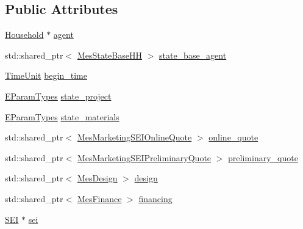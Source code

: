 \subsection*{Public Attributes}
\begin{DoxyCompactItemize}
\item 
\hyperlink{classsolar__core_1_1_household}{Household} $\ast$ \hyperlink{classsolar__core_1_1_p_v_project_a20e8115154979d2f856f1acceb6bb2b1}{agent}
\item 
std\+::shared\+\_\+ptr$<$ \hyperlink{classsolar__core_1_1_mes_state_base_h_h}{Mes\+State\+Base\+H\+H} $>$ \hyperlink{classsolar__core_1_1_p_v_project_a1a3576ddac7b82f9a2d7c139af9850d2}{state\+\_\+base\+\_\+agent}
\item 
\hyperlink{namespacesolar__core_a4b5949d07259da6f8a20d12a30403e90}{Time\+Unit} \hyperlink{classsolar__core_1_1_p_v_project_a5b8869c2a2580e5183a7796580074555}{begin\+\_\+time}
\item 
\hyperlink{namespacesolar__core_aa1147341e5ef7a40d68d1bd68e149362}{E\+Param\+Types} \hyperlink{classsolar__core_1_1_p_v_project_ab25a22c1202f2314a55dc9a759922183}{state\+\_\+project}
\item 
\hyperlink{namespacesolar__core_aa1147341e5ef7a40d68d1bd68e149362}{E\+Param\+Types} \hyperlink{classsolar__core_1_1_p_v_project_aaac22e629b55f970a4ad43b1fcd756d1}{state\+\_\+materials}
\item 
std\+::shared\+\_\+ptr$<$ \hyperlink{classsolar__core_1_1_mes_marketing_s_e_i_online_quote}{Mes\+Marketing\+S\+E\+I\+Online\+Quote} $>$ \hyperlink{classsolar__core_1_1_p_v_project_ae7998ae898c0230fbde18818cfd088a1}{online\+\_\+quote}
\item 
std\+::shared\+\_\+ptr$<$ \hyperlink{classsolar__core_1_1_mes_marketing_s_e_i_preliminary_quote}{Mes\+Marketing\+S\+E\+I\+Preliminary\+Quote} $>$ \hyperlink{classsolar__core_1_1_p_v_project_a5d75e9dfe664f7307b0dc24c1f00d8a9}{preliminary\+\_\+quote}
\item 
std\+::shared\+\_\+ptr$<$ \hyperlink{classsolar__core_1_1_mes_design}{Mes\+Design} $>$ \hyperlink{classsolar__core_1_1_p_v_project_a0e3e8228c8129ccd07e44503ef8577a8}{design}
\item 
std\+::shared\+\_\+ptr$<$ \hyperlink{classsolar__core_1_1_mes_finance}{Mes\+Finance} $>$ \hyperlink{classsolar__core_1_1_p_v_project_adf809769d8d38859f2f766fb5332b946}{financing}
\item 
\hyperlink{classsolar__core_1_1_s_e_i}{S\+E\+I} $\ast$ \hyperlink{classsolar__core_1_1_p_v_project_af8fdd82137a3b0aa277ae6b9663fcb33}{sei}

\end{DoxyCompactItemize}
